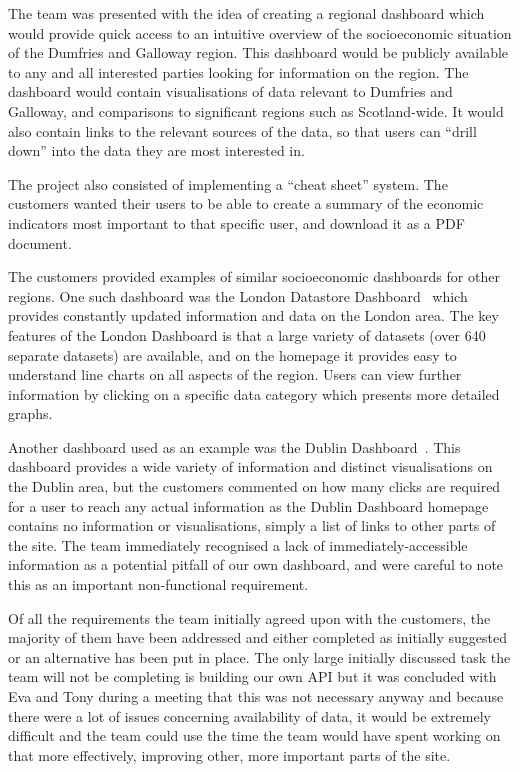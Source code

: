 \documentclass{l3proj}
\begin{document}
The team was presented with the idea of creating a regional dashboard which would provide quick access to an intuitive overview of the socioeconomic situation of the Dumfries and Galloway region. This dashboard would be publicly available to any and all interested parties looking for information on the region. The dashboard would contain visualisations of data relevant to Dumfries and Galloway, and comparisons to significant regions such as Scotland-wide. It would also contain links to the relevant sources of the data, so that users can ``drill down'' into the data they are most interested in.

The project also consisted of implementing a ``cheat sheet'' system. The customers wanted their users to be able to create a summary of the economic indicators most important to that specific user, and download it as a PDF document.

The customers provided examples of similar socioeconomic dashboards for other regions. One such dashboard was the London Datastore Dashboard~\cite{LondonDashboard} which provides constantly updated information and data on the London area. The key features of the London Dashboard is that a large variety of datasets (over 640 separate datasets) are available, and on the homepage it provides easy to understand line charts on all aspects of the region. Users can view further information by clicking on a specific data category which presents more detailed graphs.

Another dashboard used as an example was the Dublin Dashboard~\cite{DublinDashboard}. This dashboard provides a wide variety of information and distinct visualisations on the Dublin area, but the customers commented on how many clicks are required for a user to reach any actual information as the Dublin Dashboard homepage contains no information or visualisations, simply a list of links to other parts of the site. The team immediately recognised a lack of immediately-accessible information as a potential pitfall of our own dashboard, and were careful to note this as an important non-functional requirement.


Of all the requirements the team initially agreed upon with the customers, the majority of them have been addressed and either completed as initially suggested
or an alternative has been put in place. The only large initially discussed task the team will not be completing is building our own API but it was concluded
with Eva and Tony during a meeting that this was not necessary anyway and because there were a lot of issues concerning availability of data, it would be
extremely difficult and the team could use the time the team would have spent working on that more effectively, improving other, more important parts of the site.
\end{document}
